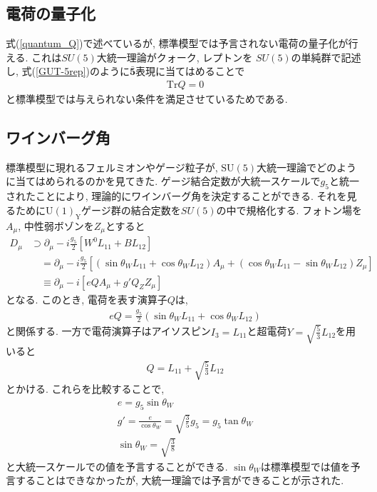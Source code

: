 \subsection{電荷の量子化}
式(\ref{quantum_Q})で述べているが, 標準模型では予言されない電荷の量子化が行える.
これは$SU(5)$大統一理論がクォーク, レプトンを $SU(5)$の単純群で記述し, 式(\ref{GUT-5rep})のように$\bar{\bm{5}}$表現に当てはめることで
\begin{align}
  \mathrm{Tr}Q = 0 \nonumber
\end{align}
と標準模型では与えられない条件を満足させているためである.
\subsection{ワインバーグ角}
標準模型に現れるフェルミオンやゲージ粒子が, $\mathrm{SU(5)}$大統一理論でどのように当てはめられるのかを見てきた.
ゲージ結合定数が大統一スケールで$g_5$と統一されたことにより, 理論的にワインバーグ角を決定することができる.
それを見るために$\mathrm{U(1)_Y}$ゲージ群の結合定数を$SU(5)$の中で規格化する.
フォトン場を$A_\mu$, 中性弱ボゾンを$Z_\mu$とすると
\begin{align}
  D_\mu &\supset \partial_\mu -i\frac{g_5}{2}[W^0 L_{11} + B L_{12}]\nonumber\\
        &\quad=\partial_\mu -i\frac{g_5}{2}[(\sin\theta_W L_{11} + \cos\theta_W L_{12})A_\mu + (\cos\theta_W L_{11} -\sin\theta_W L_{12})Z_\mu]\nonumber\\
        &\quad\equiv \partial_\mu -i[eQA_\mu + g' Q_Z Z_\mu]\nonumber
\end{align}
となる.
このとき, 電荷を表す演算子$Q$は,
\begin{align}
  eQ = \frac{g_5}{2}(\sin\theta_W L_{11} + \cos\theta_W L_{12})
\end{align}
と関係する.
一方で電荷演算子はアイソスピン$I_3 = L_{11}$と超電荷$Y=\sqrt{\frac{5}{3}}L_{12}$を用いると
\begin{align}
  Q = L_{11} + \sqrt{\frac{5}{3}}L_{12}
\end{align}
とかける.
これらを比較することで,
\begin{align}
  e = g_5\sin\theta_W\nonumber\\
  g' = \frac{e}{\cos\theta_W}=\sqrt{\frac{3}{5}}g_5 = g_5 \tan\theta_W\nonumber\\
  \sin\theta_W =\sqrt{\frac{3}{8}}
\end{align}
と大統一スケールでの値を予言することができる.
$\sin\theta_W$は標準模型では値を予言することはできなかったが, 大統一理論では予言ができることが示された.


